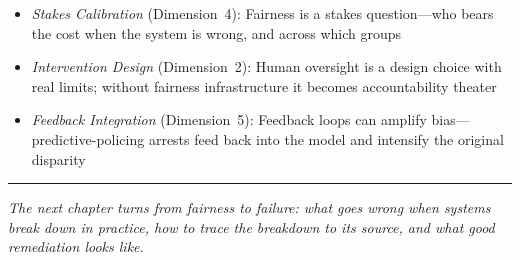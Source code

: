 \begin{itemize}
  \item \textit{Stakes Calibration} (Dimension~4): Fairness is a stakes question---who bears the cost when the system is wrong, and across which groups
  \item \textit{Intervention Design} (Dimension~2): Human oversight is a design choice with real limits; without fairness infrastructure it becomes accountability theater
  \item \textit{Feedback Integration} (Dimension~5): Feedback loops can amplify bias---predictive-policing arrests feed back into the model and intensify the original disparity
\end{itemize}

\bigskip
\begin{center}
\rule{0.5\textwidth}{0.4pt}
\end{center}
\bigskip

\noindent\textit{The next chapter turns from fairness to failure: what goes wrong when \hitl systems break down in practice, how to trace the breakdown to its source, and what good remediation looks like.}

